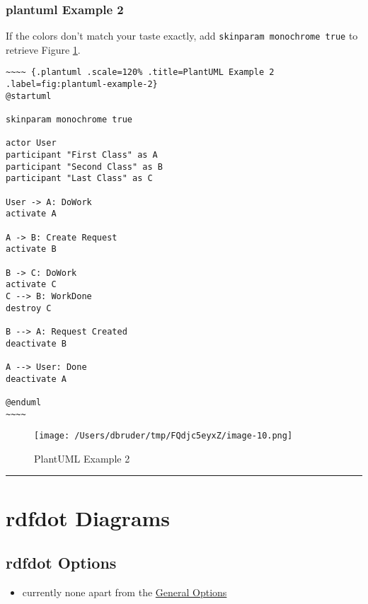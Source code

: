 \documentclass[]{article}
\begin{document}
\newpage

\subsubsection{plantuml Example 2}\label{plantuml-example-2}

If the colors don't match your taste exactly, add
\texttt{skinparam monochrome true} to retrieve Figure
\ref{fig:plantuml-example-2}.

\scriptsize

\begin{verbatim}
~~~~ {.plantuml .scale=120% .title=PlantUML Example 2 .label=fig:plantuml-example-2}
@startuml

skinparam monochrome true

actor User
participant "First Class" as A
participant "Second Class" as B
participant "Last Class" as C

User -> A: DoWork
activate A

A -> B: Create Request
activate B

B -> C: DoWork
activate C
C --> B: WorkDone
destroy C

B --> A: Request Created
deactivate B

A --> User: Done
deactivate A

@enduml
~~~~
\end{verbatim}

\normalsize

\begin{figure}[htbp]
\centering
\texttt{[image: /Users/dbruder/tmp/FQdjc5eyxZ/image-10.png]}
\caption{PlantUML Example 2\label{fig:plantuml-example-2}}
\end{figure}

\newpage

\begin{center}\rule{3in}{0.4pt}\end{center}

\newpage

\section{rdfdot Diagrams}\label{rdfdot-diagrams}

\subsection{rdfdot Options}\label{rdfdot-options}

\begin{itemize}
\itemsep1pt\parskip0pt
\item
  currently none apart from the \hyperref[general-options]{General
  Options}
\end{itemize}
\end{document}
